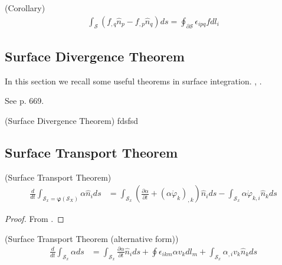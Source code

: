\documentclass[10pt]{report}
\begin{document}
{\begin{mytheorem} (Corollary)
\begin{align}
\int_\mathcal{S} \left(f_{,q}\hat{n}_p-f_{,p}\hat{n}_q\right)ds=\oint_{\partial\mathcal{S}} \epsilon_{ipq}f dl_i
\label{KelvinStokesCorollary}
\end{align}
\end{mytheorem}


\subsection{Surface Divergence Theorem}
In this section we recall some useful theorems in surface integration. \cite{Slattery2006}, \cite{Scovazzi2007}.

See \cite{Slattery:2006wn} p. 669.
\begin{mytheorem} (Surface Divergence Theorem)
fdsfsd
\end{mytheorem}

\subsection{Surface Transport Theorem}

\begin{mytheorem} (Surface Transport Theorem)
\begin{align}
\frac{d}{dt}\int_{\mathcal{S}_x=\bm \varphi (\mathcal{S}_X)}\alpha \hat{n}_ids&=\int_{\mathcal{S}_x}\left(\frac{\partial \alpha}{\partial t}+\left(\alpha \dot \varphi_k\right)_{,k}\right)\hat{n}_ids-\int_{\mathcal{S}_x}\alpha \dot\varphi_{k,i}\hat{n}_kds
\label{STT2}
\end{align}
\end{mytheorem}

\begin{proof}
From \cite{Scovazzi:2007tc}.
\end{proof}


\begin{mytheorem} (Surface Transport Theorem (alternative form))
\begin{align}
\frac{d}{dt}\int_{\mathcal{S}_x}\alpha ds&=\int_{\mathcal{S}_x}\frac{\partial \alpha}{\partial t}\hat{n}_ids+\oint\epsilon_{ikm}\alpha v_k dl_m+\int_{\mathcal{S}_x}\alpha_{,i} v_{k}\hat{n}_kds
\label{STT2L}
\end{align}
\end{mytheorem}

}
\end{document}
